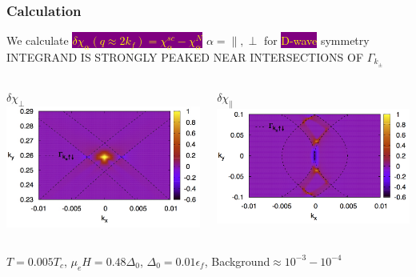 \documentclass{beamer}
\newcommand\Fontvi{\fontsize{9}{9}\selectfont}
\newcommand\Fontvii{\fontsize{4}{4}\selectfont}
\begin{document}
\begin{frame}\frametitle{Calculation}
We calculate \colorbox{purple}{\textcolor{yellow}{$\delta\chi_{\alpha}(q\approx 2k_f)=\chi^{sc}_\alpha-\chi^N_\alpha$}}  {\Fontvii$\alpha=\parallel,\perp$} for  \colorbox{purple}{\textcolor{yellow}{D-wave}} symmetry\\ \vspace{0.5cm}
INTEGRAND IS STRONGLY PEAKED NEAR INTERSECTIONS OF $\Gamma_{k_\pm}$\\[0.5cm]
 \begin{columns}
    \begin{column}{0.5\textwidth}
      \centering
      $\delta\chi_\perp$
	\includegraphics[scale=0.41]{Integrand_xx.jpg} \\    

      \end{column}
    \begin{column}{0.5\textwidth}\centering	
    $\delta\chi_\parallel$
      \includegraphics[scale=0.41]{Integrand_zz.jpg}    
	\end{column}
  \end{columns}
\begin{center}
{\Fontvi $T=0.005T_c$, $\mu_e H=0.48\Delta_0$, $\Delta_0=0.01\epsilon_f$, Background$\approx 10^{-3}-10^{-4}$}
\end{center}
\end{frame}
\end{document}
